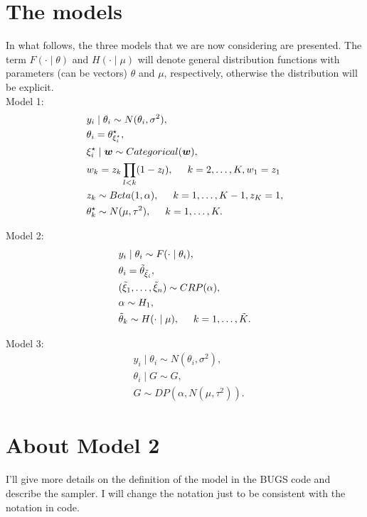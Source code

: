 \documentclass[12pt]{article}
\begin{document}
\section{The models}
In what follows, the three models that we are now considering are presented. The term $F(\cdot\mid \theta)$ and $H(\cdot \mid \mu)$ will denote general distribution functions with parameters (can be vectors) $\theta$ and $\mu$, respectively, otherwise the distribution will be explicit. \\

Model 1:
\begin{align*}
&y_i\mid \theta_i \sim N(\theta_i, \sigma^2),\\
&\theta_i= \theta^{\star}_{\xi_i^{\star}},\\
&\xi_i^{\star}\mid \boldsymbol{w} \sim Categorical(\boldsymbol{w}),\\
&w_k=z_k\prod_{l<k}(1-z_l), \hspace{0.5cm} k=2, \ldots, K, w_1=z_1\\
&z_k \sim Beta(1, \alpha), \hspace{0.5cm} k=1, \ldots, K-1, z_K=1, \\
&\theta^{\star}_k  \sim N(\mu, \tau^2), \hspace{0.5cm}k=1, \ldots, K.
\end{align*} 

Model 2:
\begin{align*}
&y_i\mid \theta_i \sim F(\cdot \mid \theta_i),\\
&\theta_i= \tilde{\theta}_{\tilde{\xi}_i},\\
&(\tilde{\xi}_1, \ldots, \tilde{\xi}_n) \sim CRP(\alpha),\\
&\alpha \sim H_1,\\
&\tilde{\theta}_k  \sim H(\cdot\mid \mu), \hspace{0.5cm}k=1, \ldots, 	\tilde{K}.
\end{align*} 

Model 3:
\begin{align*}
&y_i\mid \theta_i \sim N(\theta_i, \sigma^2),\\
&\theta_i\mid G\sim G,\\
&G  \sim DP(\alpha, N(\mu, \tau^2)).
\end{align*} 




\section{About Model 2}
I'll give more details on the definition of the model in the BUGS code and describe the sampler. I will change the notation just to be consistent with the notation in code.
\end{document}
